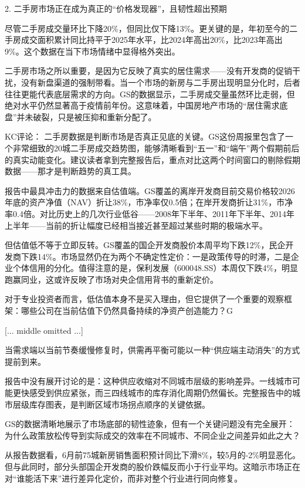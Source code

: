 \documentclass[11pt]{ctexart}
\begin{document}
2. 二手房市场正在成为真正的“价格发现器”，且韧性超出预期

尽管二手房成交量环比下降20\%，但同比仅下降13\%。更关键的是，年初至今的二手房成交面积累计同比持平于2025年水平，比2024年高出20\%，比2023年高出9\%。这个数据在当下市场情绪中显得格外突出。

二手房市场之所以重要，是因为它反映了真实的居住需求——没有开发商的促销干扰，没有新盘渠道的强制带看。当一个市场的新房与二手房出现明显分化时，后者往往更能代表底层需求的方向。GS的数据显示，二手房成交量虽然环比走弱，但绝对水平仍然显著高于疫情前年份。这意味着，中国房地产市场的“居住需求底盘”并未破裂，只是被压抑和重新分配了。

KC评论： 二手房数据是判断市场是否真正见底的关键。GS这份周报里包含了一个非常细致的20城二手房成交趋势图，能够清晰看到“五一”和“端午”两个假期前后的真实动能变化。建议读者拿到完整报告后，重点对比这两个时间窗口的剔除假期数据——那才是判断趋势的真工具。

报告中最具冲击力的数据来自估值端。GS覆盖的离岸开发商目前交易价格较2026年底的资产净值（NAV）折让38\%，市净率仅0.5倍；在岸开发商折让31\%，市净率0.4倍。对比历史上的几次行业低谷——2008年下半年、2011年下半年、2014年上半年——当前的折让幅度已经相当接近甚至超过某些时期的极端水平。

但估值低不等于立即反转。GS覆盖的国企开发商股价本周平均下跌12\%，民企开发商下跌14\%。市场显然仍在为两个不确定性定价：一是政策传导的时滞，二是企业个体信用的分化。值得注意的是，保利发展（600048.SS）本周仅下跌4\%，明显跑赢同业，这或许反映了市场对央企信用背书的重新定价。

对于专业投资者而言，低估值本身不是买入理由，但它提供了一个重要的观察框架：哪些公司在当前估值下仍然具备持续的净资产创造能力？G

[... middle omitted ...]

当需求端以当前节奏缓慢修复时，供需再平衡可能以一种“供应端主动消失”的方式提前到来。

报告中没有展开讨论的是：这种供应收缩对不同城市层级的影响差异。一线城市可能更快感受到供应紧张，而三四线城市的库存消化周期仍然偏长。完整报告中的城市层级库存图表，是判断区域市场拐点顺序的关键依据。

GS的数据清晰地展示了市场底部的韧性迹象，但有一个关键问题没有完全展开：为什么政策放松传导到实际成交的效率在不同城市、不同企业之间差异如此之大？

从报告数据看，6月前75城新房销售面积预计同比下滑8\%，较5月的-2\%明显恶化。但与此同时，部分头部国企开发商的股价跌幅反而小于行业平均。这暗示市场正在对“谁能活下来”进行差异化定价，而非对整个行业进行同向修复。
\end{document}
